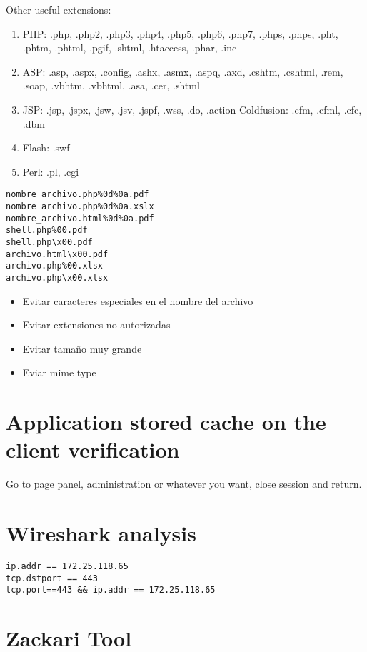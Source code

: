 Other useful extensions:

\begin{enumerate}
    \item PHP: .php, .php2, .php3, .php4, .php5, .php6, .php7, .phps, .phps, .pht, .phtm, .phtml, .pgif, .shtml, .htaccess, .phar, .inc
    \item ASP: .asp, .aspx, .config, .ashx, .asmx, .aspq, .axd, .cshtm, .cshtml, .rem, .soap, .vbhtm, .vbhtml, .asa, .cer, .shtml
    \item JSP: .jsp, .jspx, .jsw, .jsv, .jspf, .wss, .do, .action Coldfusion: .cfm, .cfml, .cfc, .dbm
    \item Flash: .swf
    \item Perl: .pl, .cgi
\end{enumerate}
 
\begin{lstlisting}[numbers=none]
nombre_archivo.php%0d%0a.pdf
nombre_archivo.php%0d%0a.xslx
nombre_archivo.html%0d%0a.pdf
shell.php%00.pdf
shell.php\x00.pdf
archivo.html\x00.pdf
archivo.php%00.xlsx
archivo.php\x00.xlsx
\end{lstlisting}

\begin{itemize}
	\item Evitar caracteres especiales en el nombre del archivo
\item Evitar extensiones no autorizadas
\item Evitar tamaño muy grande
\item Eviar mime type 

\end{itemize}

\section{Application stored cache on the client verification}

Go to page panel, administration or whatever you want, close session and return.

\section{Wireshark analysis}


\begin{lstlisting}[numbers=none]
ip.addr == 172.25.118.65
tcp.dstport == 443	
tcp.port==443 && ip.addr == 172.25.118.65
\end{lstlisting}


\section{Zackari Tool}

